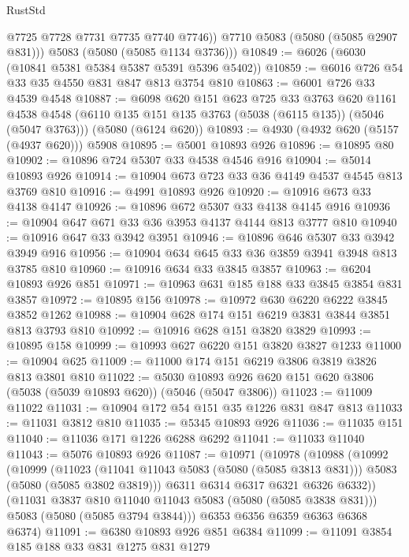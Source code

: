 \begin{lexlean}{RustStd}
\begin{coremodule}
{\begin{coremodule}
{{{{{            @7725
            @7728
            @7731
            @7735
            @7740
            @7746))
        @7710
        @5083
        (@5080 (@5085 @2907 @831)))
      @5083
      (@5080 (@5085 @1134 @3736)))
@10849 := @6026 (@6030 (@10841 @5381 @5384 @5387 @5391 @5396 @5402))
@10859 := @6016 @726 @54 @33 @35 @4550 @831 @847 @813 @3754 @810
@10863 := @6001 @726 @33 @4539 @4548
@10887 := @6098
    @620
    @151
    @623
    @725
    @33
    @3763
    @620
    @1161
    @4538
    @4548
    (@6110 @135 @151 @135 @3763 (@5038 (@6115 @135)) (@5046 (@5047 @3763)))
    (@5080 (@6124 @620))
@10893 := @4930 (@4932 @620 (@5157 (@4937 @620))) @5908
@10895 := @5001 @10893 @926
@10896 := @10895 @80
@10902 := @10896 @724 @5307 @33 @4538 @4546 @916
@10904 := @5014 @10893 @926
@10914 := @10904 @673 @723 @33 @36 @4149 @4537 @4545 @813 @3769 @810
@10916 := @4991 @10893 @926
@10920 := @10916 @673 @33 @4138 @4147
@10926 := @10896 @672 @5307 @33 @4138 @4145 @916
@10936 := @10904 @647 @671 @33 @36 @3953 @4137 @4144 @813 @3777 @810
@10940 := @10916 @647 @33 @3942 @3951
@10946 := @10896 @646 @5307 @33 @3942 @3949 @916
@10956 := @10904 @634 @645 @33 @36 @3859 @3941 @3948 @813 @3785 @810
@10960 := @10916 @634 @33 @3845 @3857
@10963 := @6204 @10893 @926 @851
@10971 := @10963 @631 @185 @188 @33 @3845 @3854 @831 @3857
@10972 := @10895 @156
@10978 := @10972 @630 @6220 @6222 @3845 @3852 @1262
@10988 := @10904 @628 @174 @151 @6219 @3831 @3844 @3851 @813 @3793 @810
@10992 := @10916 @628 @151 @3820 @3829
@10993 := @10895 @158
@10999 := @10993 @627 @6220 @151 @3820 @3827 @1233
@11000 := @10904 @625
@11009 := @11000 @174 @151 @6219 @3806 @3819 @3826 @813 @3801 @810
@11022 := @5030 @10893 @926 @620 @151 @620 @3806 (@5038 (@5039 @10893 @620)) (@5046 (@5047 @3806))
@11023 := @11009 @11022
@11031 := @10904 @172 @54 @151 @35 @1226 @831 @847 @813
@11033 := @11031 @3812 @810
@11035 := @5345 @10893 @926
@11036 := @11035 @151
@11040 := @11036 @171 @1226 @6288 @6292
@11041 := @11033 @11040
@11043 := @5076 @10893 @926
@11087 := @10971
    (@10978
      (@10988
        (@10992
          (@10999
            (@11023
              (@11041 @11043 @5083 (@5080 (@5085 @3813 @831)))
              @5083
              (@5080 (@5085 @3802 @3819)))
            @6311
            @6314
            @6317
            @6321
            @6326
            @6332))
        (@11031 @3837 @810 @11040 @11043 @5083 (@5080 (@5085 @3838 @831)))
        @5083
        (@5080 (@5085 @3794 @3844)))
      @6353
      @6356
      @6359
      @6363
      @6368
      @6374)
@11091 := @6380 @10893 @926 @851 @6384
@11099 := @11091 @3854 @185 @188 @33 @831 @1275 @831 @1279
}}}}}
\end{coremodule}}
\end{coremodule}
\end{lexlean}
